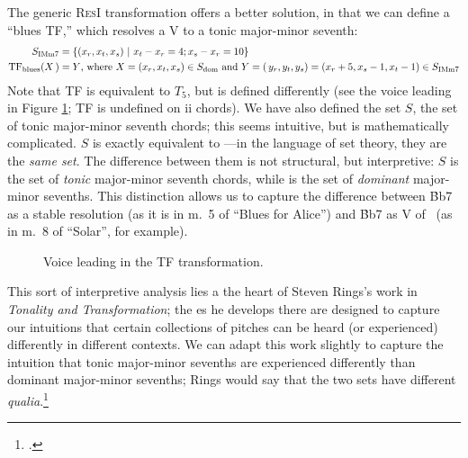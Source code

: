 {The generic \textsc{ResI} transformation offers a better solution, in that we
can define a ``blues TF,'' which resolves a V to a tonic major-minor
seventh:%
%
\begin{align*}
  S_{\mathrm{IMm7}} &= \{ (x_r, x_t, x_s)\ |\ x_t - x_r = 4; x_s - x_r = 10 \} \\
  \mathrm{TF}_{\mathrm{blues}}(X\,) &= Y\text{, where}\ X = (x_r, x_t, x_s)
                                      \in S_{\mathrm{dom}}
                                      \text{ and}\
                                      Y=(\,y_r, y_t, y_s)=(x_r+5, x_s-1, x_t-1)
                                      \in S_{\mathrm{IMm7}}
\end{align*}
%
Note that TF is equivalent to $T_5$, but is defined differently
(see the voice leading in Figure \ref{tfe:tf-blues-voice-leading}; TF is
undefined on ii\tsup{7} chords). We have also defined the set $S$, the
set of tonic major-minor seventh chords; this seems intuitive, but is
mathematically complicated. $S$\tsub{IMm7} is exactly equivalent to \Sdom---in
the language of set theory, they are the \emph{same set}. The difference
between them is not structural, but interpretive: $S$\tsub{IMm7} is the set of
\emph{tonic} major-minor seventh chords, while \Sdom is the set of
\emph{dominant} major-minor sevenths. This distinction allows us to capture
the difference between \h{Bb7} as a stable resolution (as it is in m.~5 of
``Blues for Alice'') and \h{Bb7} as V\tsup{7} of \Eflat\ (as in m.~8 of
``Solar'', for example).

\begin{figure}[tbp]
  \caption{Voice leading in the TF transformation.}
  \label{tfe:tf-blues-voice-leading}
\end{figure}

This sort of interpretive analysis lies a the heart of Steven Rings's work in
\emph{Tonality and Transformation}; the \gis{}es he develops there are
designed to capture our intuitions that certain collections of pitches can be
heard (or experienced) differently in different contexts. We can adapt this
work slightly to capture the intuition that tonic major-minor sevenths are
experienced differently than dominant major-minor sevenths; Rings would say
that the two sets have different \emph{qualia}.\footcite[41--43 (and
throughout)]{rings:2011}

}
